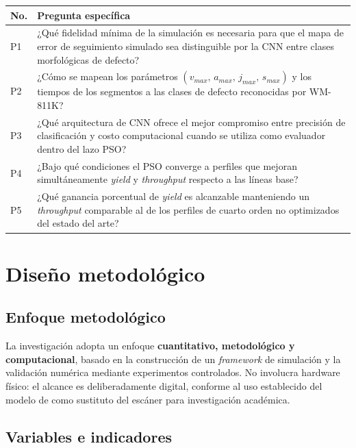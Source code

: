 \documentclass[11pt]{article}
\begin{document}
\begin{table}[H]
\centering
\small
\setlength{\tabcolsep}{6pt}
\renewcommand{\arraystretch}{1.35}
\begin{tabular}{C{0.8cm} L{14cm}}
\toprule
\textbf{No.} & \textbf{Pregunta específica} \\
\midrule
P1 & ¿Qué fidelidad mínima de la simulación es necesaria para que el mapa de error de seguimiento simulado sea distinguible por la CNN entre clases morfológicas de defecto? \\
P2 & ¿Cómo se mapean los parámetros $(v_{max},\,a_{max},\,j_{max},\,s_{max})$ y los tiempos de los segmentos a las clases de defecto reconocidas por WM-811K? \\
P3 & ¿Qué arquitectura de CNN ofrece el mejor compromiso entre precisión de clasificación y costo computacional cuando se utiliza como evaluador dentro del lazo PSO? \\
P4 & ¿Bajo qué condiciones el PSO converge a perfiles que mejoran simultáneamente \textit{yield} y \textit{throughput} respecto a las líneas base? \\
P5 & ¿Qué ganancia porcentual de \textit{yield} es alcanzable manteniendo un \textit{throughput} comparable al de los perfiles de cuarto orden no optimizados del estado del arte? \\
\bottomrule
\end{tabular}
\end{table}

\section{Diseño metodológico}

\subsection*{Enfoque metodológico}

La investigación adopta un enfoque \textbf{cuantitativo, metodológico y computacional}, basado en la construcción de un \textit{framework} de simulación y la validación numérica mediante experimentos controlados. No involucra hardware físico: el alcance es deliberadamente digital, conforme al uso establecido del modelo de \cite{Al-Rawashdeh2022_Caracterization} como sustituto del escáner para investigación académica.

\subsection*{Variables e indicadores}
\end{document}
